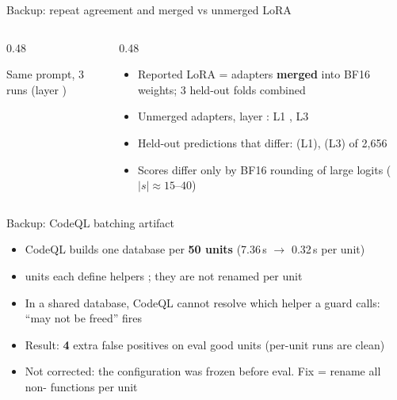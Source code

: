 \begin{frame}{Backup: repeat agreement and merged vs unmerged LoRA}
  \begin{columns}[T]
    \begin{column}{0.48\textwidth}
      {\small Same prompt, 3 runs (layer )\\[2pt]
      \par}
    \end{column}
    \begin{column}{0.48\textwidth}
      \begin{itemize}\small
        \item Reported LoRA = adapters \textbf{merged} into BF16 weights; 3 held-out folds combined
        \item Unmerged adapters, layer : L1 , L3 
        \item Held-out predictions that differ:  (L1),  (L3) of 2,656
        \item Scores differ only by BF16 rounding of large logits ($|s|\approx15$--$40$)
      \end{itemize}
    \end{column}
  \end{columns}
\end{frame}

\begin{frame}{Backup: CodeQL batching artifact}
  \begin{itemize}
    \item CodeQL builds one database per \textbf{50 units} (7.36\,s $\to$ 0.32\,s per unit)
    \item {} units each define helpers ; they are not renamed per unit
    \item In a shared database, CodeQL cannot resolve which helper a guard calls: ``may not be freed'' fires
    \item Result: \textbf{4} extra false positives on eval good units (per-unit runs are clean)
    \item Not corrected: the configuration was frozen before eval. Fix = rename all non- functions per unit
  \end{itemize}
\end{frame}

